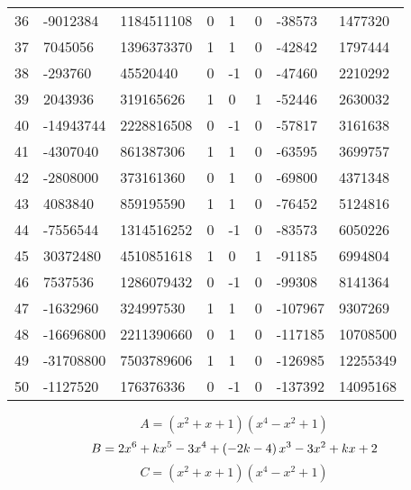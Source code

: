 \documentclass{amsart}
\begin{document}
\begin{longtable}{|l|l|l|lllll|}
36&-9012384&1184511108&0&1&0&-38573&1477320\\
37&7045056&1396373370&1&1&0&-42842&1797444\\
38&-293760&45520440&0&-1&0&-47460&2210292\\
39&2043936&319165626&1&0&1&-52446&2630032\\
40&-14943744&2228816508&0&-1&0&-57817&3161638\\
41&-4307040&861387306&1&1&0&-63595&3699757\\
42&-2808000&373161360&0&1&0&-69800&4371348\\
43&4083840&859195590&1&1&0&-76452&5124816\\
44&-7556544&1314516252&0&-1&0&-83573&6050226\\
45&30372480&4510851618&1&0&1&-91185&6994804\\
46&7537536&1286079432&0&-1&0&-99308&8141364\\
47&-1632960&324997530&1&1&0&-107967&9307269\\
48&-16696800&2211390660&0&1&0&-117185&10708500\\
49&-31708800&7503789606&1&1&0&-126985&12255349\\
50&-1127520&176376336&0&-1&0&-137392&14095168\\
\hline
\end{longtable}
$$A=(x^2
 + x
 + 1)(x^4
 - x^2
 + 1)$$
$$B=2\*x^6
 + k\*x^5
 - 3\*x^4
 + \left(-2\*k
 - 4\right) \*x^3
 - 3\*x^2
 + k\*x
 + 2$$
$$C=(x^2
 + x
 + 1)(x^4
 - x^2
 + 1)$$
\end{document}
